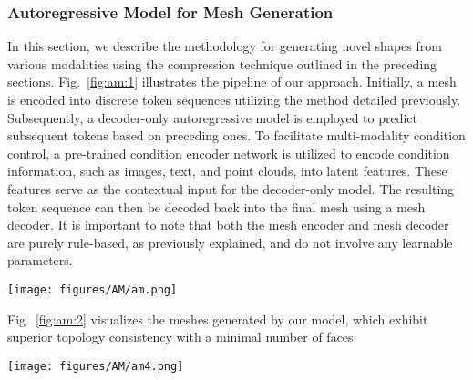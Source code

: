 \subsubsection{Autoregressive Model for Mesh Generation}
In this section, we describe the methodology for generating novel shapes from various modalities using the compression technique outlined in the preceding sections. Fig.~\ref{fig:am:1} illustrates the pipeline of our approach. Initially, a mesh is encoded into discrete token sequences utilizing the method detailed previously. Subsequently, a decoder-only autoregressive model is employed to predict subsequent tokens based on preceding ones. To facilitate multi-modality condition control, a pre-trained condition encoder network is utilized to encode condition information, such as images, text, and point clouds, into latent features. These features serve as the contextual input for the decoder-only model. The resulting token sequence can then be decoded back into the final mesh using a mesh decoder. It is important to note that both the mesh encoder and mesh decoder are purely rule-based, as previously explained, and do not involve any learnable parameters.

\begin{figure*}
    \centering 
    \texttt{[image: figures/AM/am.png]}
    \caption[Pipeline for Artist-Created Meshes Generation.]
    {Pipeline for Artist-Created Mesh Generation. Initially, meshes are encoded into discrete token sequences. These sequences are then processed through a decoder-only autoregressive model that utilizes a Transformer network architecture. To enforce multi-modality condition control, a pretrained condition encoder network is employed. This network effectively integrates diverse modalities, ensuring that the generated meshes adhere to specified conditions.}
    \label{fig:am:1}
\end{figure*}

Fig.~\ref{fig:am:2} visualizes the meshes generated by our model, which exhibit superior topology consistency with a minimal number of faces.


\begin{figure*}
    \centering 
    \texttt{[image: figures/AM/am4.png]}
    \caption[Example Meshes Generated by Our Artist-Created Meshes Generation Model.]
    {Example Meshes Generated by Our Artist-Created Mesh Generation Model. The meshes produced by our model demonstrate superior performance in maintaining topological consistency, showcasing the effectiveness of our approach in generating high-quality artistic meshes.}
    \label{fig:am:2}
\end{figure*}